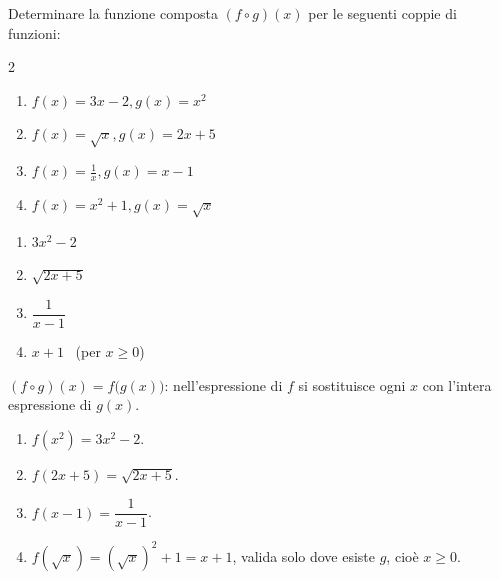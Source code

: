 \begin{question}[ID=5.2, subtitle={Funzione composta $(f\circ g)(x)$ — serie 2}, difficulty=media, tags={funzioni,composte}]
Determinare la funzione composta \( (f\circ g)(x) \) per le seguenti coppie di funzioni:

\begin{center}\begin{minipage}{0.92\linewidth}
\begin{multicols}{2}
\begin{enumerate}[leftmargin=3.2cm]
\item $f(x)=3x-2, g(x)=x^2$
\item $f(x)=\sqrt{x}, g(x)=2x+5$
\item $f(x)=\frac{1}{x}, g(x)=x-1$
\item $f(x)=x^2+1, g(x)=\sqrt{x}$
\end{enumerate}
\end{multicols}
\end{minipage}\end{center}
\begin{solution}
\begin{enumerate}
    \item $3x^2-2$
    \item $\sqrt{2x+5}$
    \item $\dfrac{1}{x-1}$
    \item $x+1$ \ (per $x\geq0$)
\end{enumerate}
\end{solution}
\begin{explanation}
$(f\circ g)(x)=f\big(g(x)\big)$: nell'espressione di $f$ si sostituisce ogni $x$ con l'intera espressione di $g(x)$.
\begin{enumerate}
    \item $f(x^2)=3x^2-2$.
    \item $f(2x+5)=\sqrt{2x+5}$.
    \item $f(x-1)=\dfrac{1}{x-1}$.
    \item $f(\sqrt x)=(\sqrt x)^2+1=x+1$, valida solo dove esiste $g$, cioè $x\geq0$.
\end{enumerate}
\end{explanation}
\end{question}


